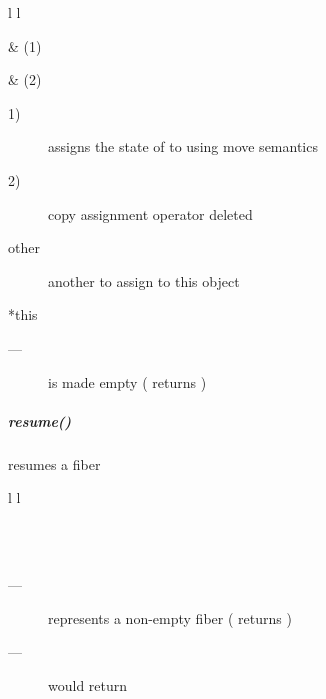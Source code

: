 \begin{tabular}{ l l }
    \midrule

     & (1)\\

    \midrule

     & (2)\\

    \midrule
\end{tabular}

\effects
\begin{description}
    \item[1)] assigns the state of  to  using move semantics
    \item[2)] copy assignment operator deleted
\end{description}

\params
\begin{description}
    \item[other]   another \fiber to assign to this object
\end{description}

\returns
\begin{description}
    \item[*this]
\end{description}

\postcond
\begin{description}
    \item[---]  is made empty ( returns )
\end{description}


\subparagraph*{resume()}
resumes a fiber

\begin{tabular}{ l l }
    \midrule

    \\
    \\

    \midrule
\end{tabular}

\requires
\begin{description}
    \item[---]  represents a non-empty fiber ( returns )
    \item[---] \canxtresume would return 
\end{description}

